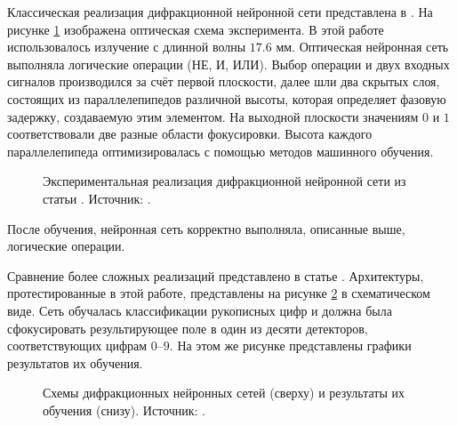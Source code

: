 \FloatBarrier\par
Классическая реализация дифракционной нейронной сети представлена в \cite{qian2020performing}. На рисунке \ref{ris:ClassicD2NN} изображена оптическая схема эксперимента. В этой работе использовалось излучение с длинной волны $17.6$ мм. Оптическая нейронная сеть выполняла логические операции (НЕ, И, ИЛИ). Выбор операции и двух входных сигналов производился за счёт первой плоскости, далее шли два скрытых слоя, состоящих из параллелепипедов различной высоты, которая определяет фазовую задержку, создаваемую этим элементом. На выходной плоскости значениям $0$ и $1$ соответствовали две разные области фокусировки. Высота каждого параллелепипеда оптимизировалась с помощью методов машинного обучения. 
\begin{figure}[htbp]
	\caption{Экспериментальная реализация дифракционной нейронной сети из статьи \cite{qian2020performing}. Источник: \cite{qian2020performing}.}
	\label{ris:ClassicD2NN}
\end{figure}
После обучения, нейронная сеть корректно выполняла, описанные выше, логические операции.

\FloatBarrier\par
Сравнение более сложных реализаций представлено в статье \cite{yan2019fourier}. Архитектуры, протестированные в этой работе, представлены на рисунке \ref{ris:FD2NN} в схематическом виде. Сеть обучалась классификации рукописных цифр и должна была сфокусировать результирующее поле в один из десяти детекторов, соответствующих цифрам $0$--$9$. На этом же рисунке представлены графики результатов их обучения.
\begin{figure}[htbp]
	\caption{Схемы дифракционных нейронных сетей (сверху) и результаты их обучения (снизу). Источник: \cite{yan2019fourier}.}
	\label{ris:FD2NN}
\end{figure}






